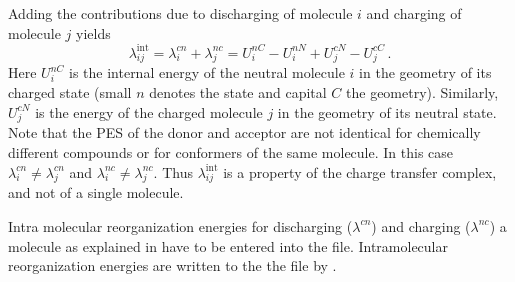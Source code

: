 Adding the contributions due to discharging of molecule $i$ and charging of molecule $j$ yields~\cite{bredas_charge-transfer_2004}
\begin{equation}
\lambda_{ij}^\text{int} =\lambda_{i}^{cn}+\lambda_{j}^{nc}=U_{i}^{nC}-U_{i}^{nN}+U_{j}^{cN}-U_{j}^{cC}\,.
\label{equ:lambdas}
\end{equation}
Here $U_{i}^{nC}$ is the internal energy of the neutral molecule $i$ in the geometry of its charged state (small $n$ denotes the state and capital $C$ the geometry). Similarly, $U_{j}^{cN}$ is the energy of the charged molecule $j$ in  the geometry of its neutral state.
%
Note that the PES of the donor and acceptor are not identical for chemically different compounds or for conformers of the same molecule. In this case $\lambda_{i}^{cn} \ne \lambda_{j}^{cn}$ and  $\lambda_{i}^{nc} \ne \lambda_{j}^{nc}$. Thus $\lambda_{ij}^\text{int}$ is a property of the charge transfer complex, and not of a single molecule.

Intra molecular reorganization energies for discharging ($\lambda^{cn}$) and charging ($\lambda^{nc}$) a molecule as explained in  have to be entered into the \xmlsegments file. Intramolecular reorganization energies are written to the the \sqlstate file by \ctpmap.

